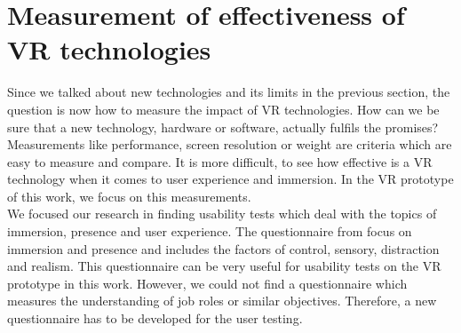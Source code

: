 \section{Measurement of effectiveness of VR technologies}
Since we talked about new technologies and its limits in the previous section, the question is now how to measure the impact of VR technologies. How can we be sure that a new technology, hardware or software, actually fulfils the promises? Measurements like performance, screen resolution or weight are criteria which are easy to measure and compare. It is more difficult, to see how effective is a VR technology when it comes to user experience and immersion. In the VR prototype of this work, we focus on this measurements. \\
We focused our research in finding usability tests which deal with the topics of immersion, presence and user experience. The questionnaire from \cite{Witmer.1998} focus on immersion and presence and includes the factors of control, sensory, distraction and realism. This questionnaire can be very useful for usability tests on the VR prototype in this work. However, we could not find a questionnaire which measures the understanding of job roles or similar objectives. Therefore, a new questionnaire has to be developed for the user testing.